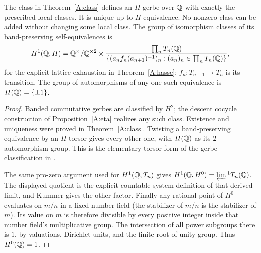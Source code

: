 \begin{theorem}
\label{A:unconditional}
The class in Theorem~\ref{A:class} defines an $H$-gerbe over
$\mathbb Q$ with exactly the prescribed local classes. It is unique up
to $H$-equivalence. No nonzero class can be added without changing
some local class. The group of isomorphism classes of its
band-preserving self-equivalences is
\[
 H^1(\mathbb Q,H)=\mathbb Q^\times/\mathbb Q^{\times2}\times
  \frac{\prod_n T_n(\mathbb Q)}
  {\{(a_n f_n(a_{n+1})^{-1})_n:(a_n)_n\in\prod_nT_n(\mathbb Q)\}},
\]
for the explicit lattice exhaustion in Theorem~\ref{A:hasse};
$f_n:T_{n+1}\to T_n$ is its transition. The group of automorphisms
of any one such equivalence is $H(\mathbb Q)=\{\pm1\}$.
\end{theorem}
\begin{proof}
Banded commutative gerbes are classified by $H^2$; the descent
cocycle construction of Proposition~\ref{A:eta} realizes any such
class. Existence and uniqueness were proved in
Theorem~\ref{A:class}. Twisting a band-preserving equivalence by
an $H$-torsor gives every other one, with $H(\mathbb Q)$ as its
$2$-automorphism group. This is the elementary torsor form of
the gerbe classification in \citet[\S5]{AMilne2003}.

The same pro-zero argument used for $H^1(\mathbb Q,T_n)$ gives
$H^1(\mathbb Q,H^0)=\varprojlim{}^1 T_n(\mathbb Q)$. The displayed quotient
is the explicit countable-system definition of that derived
limit, and Kummer gives the other factor. Finally any rational
point of $H^0$ evaluates on $m/n$ in a fixed number field
(the stabilizer of $m/n$ is the stabilizer of $m$). Its value on
$m$ is therefore divisible by every positive integer inside that
number field's multiplicative group. The intersection of all
power subgroups there is $1$, by valuations, Dirichlet units,
and the finite root-of-unity group. Thus $H^0(\mathbb Q)=1$.
\end{proof}

